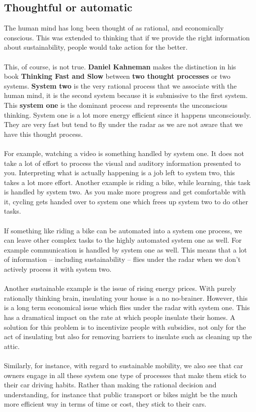 \documentclass[../summary.tex]{subfiles}
\begin{document}
		\newpage	
		\subsection{Thoughtful or automatic}
			The human mind has long been thought of as rational, and economically conscious. This was extended to thinking that if we provide the right information about sustainability, people would take action for the better. \\
			\\
			This, of course, is not true. \textbf{Daniel Kahneman} makes the distinction in his book \textbf{Thinking Fast and Slow} between \textbf{two thought processes} or two systems. \textbf{System two} is the very rational process that we associate with the human mind, it is the second system because it is submissive to the first system. This \textbf{system one} is the dominant process and represents the unconscious thinking. System one is a lot more energy efficient since it happens unconsciously. They are very fast but tend to fly under the radar as we are not aware that we have this thought process. \\
			\\
			For example, watching a video is something handled  by system one. It does not take a lot of effort to process the visual and auditory information presented to you. Interpreting what is actually happening is a job left to system two, this takes a lot more effort. Another example is riding a bike, while learning, this task is handled by system two. As you make more progress and get comfortable with it, cycling gets handed over to system one which frees up system two to do other tasks. \\
			\\
			If something like riding a bike can be automated into a system one process, we can leave other complex tasks to the highly automated system one as well. For example communication is handled by system one as well. This means that a lot of information -- including sustainability -- flies under the radar when we don't actively process it with system two. \\
			\\
			Another sustainable example is the issue of rising energy prices. With purely rationally thinking brain, insulating your house is a no no-brainer.  However, this is a long term economical issue which flies under the radar with system one. This has a dramatical impact on the rate at which people insulate their homes. A solution for this problem is to incentivize people with subsidies, not only for the act of insulating but also for removing barriers to  insulate such as cleaning up the attic. \\
			\\
			Similarly, for instance, with regard to sustainable mobility, we also see that car owners engage in all these system one type of processes that make them stick to their car driving habits. Rather than making the rational decision and understanding, for instance that public transport or bikes might be the much more efficient way in terms of time or cost, they stick to their cars.
			\newpage
\end{document}
